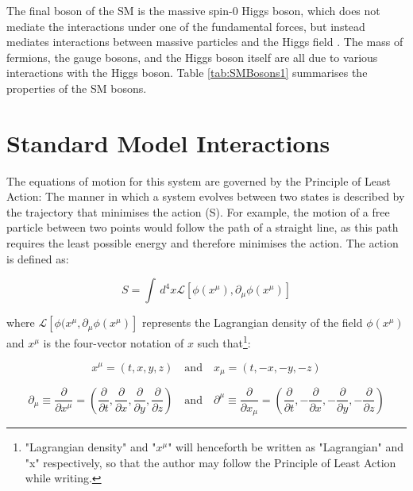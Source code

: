 \documentclass[12pt,a4paper,epsf,portrait,times,epsfig]{report}
\begin{document}
	The final boson of the SM is the massive spin-0 Higgs boson, which does not mediate the interactions under one of the fundamental forces, but instead mediates interactions between massive particles and the Higgs field \cite{DiscoHiggsATLAS}\cite{DiscoHiggsCMS}. The mass of fermions, the gauge bosons, and the Higgs boson itself are all due to various interactions with the Higgs boson. Table \ref{tab:SMBosons1} summarises the properties of the SM bosons. 
	

	\section{Standard Model Interactions}

	The equations of motion for this system are governed by the Principle of Least Action: The manner in which a system evolves between two states is described by the trajectory that minimises the action (S). For example, the motion of a free particle between two points would follow the path of a straight line, as this path requires the least possible energy and therefore minimises the action. The action is defined as:
	
	\begin{equation}
		S = \int \,d^{4}x \mathcal{L}[\phi(x^{\mu}),\partial_{\mu}\phi(x^{\mu})]
	\end{equation}

	where $\mathcal{L}[\phi(x^{\mu},\partial_{\mu}\phi(x^{\mu})]$ represents the Lagrangian density of the field $\phi(x^{\mu})$ and $x^{\mu}$ is the four-vector notation of $x$ such that\footnote{"Lagrangian density" and "$x^{\mu}$" will henceforth be written as "Lagrangian" and "x" respectively, so that the author may follow the Principle of Least Action while writing.}:
	
	\begin{equation}
		x^{\mu} = (t, x, y, z)
		\quad\mathrm{and}\quad
		x_{\mu} = (t, -x, -y, -z)
	\end{equation} 

	\begin{equation}
		\partial_{\mu} \equiv \frac{\partial}{\partial x^{\mu}}=(\frac{\partial}{\partial t}, \frac{\partial}{\partial x}, \frac{\partial}{\partial y}, \frac{\partial}{\partial z})
		\quad\mathrm{and}\quad
		\partial^{\mu} \equiv \frac{\partial}{\partial x_{\mu}}=(\frac{\partial}{\partial t}, -\frac{\partial}{\partial x}, -\frac{\partial}{\partial y}, -\frac{\partial}{\partial z})
	\end{equation}
\end{document}
